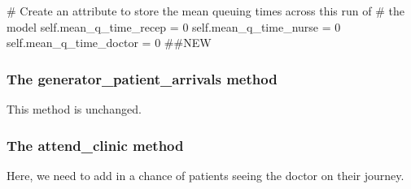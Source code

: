 \documentclass[
  letterpaper,
  DIV=11,
  numbers=noendperiod]{scrreprt}
\newenvironment{Shaded}{\begin{snugshade}}{\end{snugshade}}
\newcommand{\CommentTok}[1]{\textcolor[rgb]{0.37,0.37,0.37}{#1}}
\newcommand{\DecValTok}[1]{\textcolor[rgb]{0.68,0.00,0.00}{#1}}
\newcommand{\NormalTok}[1]{\textcolor[rgb]{0.00,0.23,0.31}{#1}}
\newcommand{\OperatorTok}[1]{\textcolor[rgb]{0.37,0.37,0.37}{#1}}
\newcommand{\VariableTok}[1]{\textcolor[rgb]{0.07,0.07,0.07}{#1}}
\begin{document}
\begin{Shaded}
\begin{Highlighting}[]
        \CommentTok{\# Create an attribute to store the mean queuing times across this run of}
        \CommentTok{\# the model}
        \VariableTok{self}\NormalTok{.mean\_q\_time\_recep }\OperatorTok{=} \DecValTok{0}
        \VariableTok{self}\NormalTok{.mean\_q\_time\_nurse }\OperatorTok{=} \DecValTok{0}
        \VariableTok{self}\NormalTok{.mean\_q\_time\_doctor }\OperatorTok{=} \DecValTok{0} \CommentTok{\#\#NEW}
\end{Highlighting}
\end{Shaded}

\subsubsection{The generator\_patient\_arrivals
method}\label{the-generator_patient_arrivals-method}

This method is unchanged.

\subsubsection{The attend\_clinic
method}\label{the-attend_clinic-method}

Here, we need to add in a chance of patients seeing the doctor on their
journey.
\end{document}
